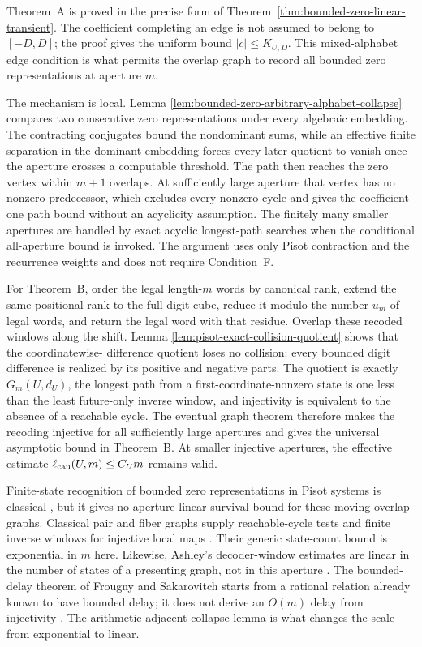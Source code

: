 Theorem~A is proved in the precise form of
Theorem~\ref{thm:bounded-zero-linear-transient}.  The coefficient completing
an edge is not assumed to belong to $[-D,D]$; the proof gives the uniform
bound $|c|\le K_{U,D}$.  This mixed-alphabet edge condition is what permits
the overlap graph to record all bounded zero representations at aperture
$m$.

The mechanism is local.  Lemma
\ref{lem:bounded-zero-arbitrary-alphabet-collapse} compares two consecutive
zero representations under every algebraic embedding.  The contracting
conjugates bound the nondominant sums, while an effective finite separation
in the dominant embedding forces every later quotient to vanish once the
aperture crosses a computable threshold.  The path then reaches the zero
vertex within $m+1$ overlaps.  At sufficiently large aperture that vertex
has no nonzero predecessor, which excludes every nonzero cycle and gives
the coefficient-one path bound without an acyclicity assumption.  The
finitely many smaller apertures are handled by exact acyclic longest-path
searches when the conditional all-aperture bound is invoked.  The argument
uses only Pisot contraction and the recurrence weights and does not require
Condition~F.

For Theorem~B, order the legal length-$m$ words by canonical rank, extend the
same positional rank to the full digit cube, reduce it modulo the number
$u_m$ of legal words, and return the legal word with that residue.  Overlap
these recoded windows along the shift.  Lemma
\ref{lem:pisot-exact-collision-quotient} shows that the coordinatewise-
difference quotient loses no collision: every bounded digit difference is
realized by its positive and negative parts.  The quotient is exactly
$G_m(U,d_U)$, the longest path from a first-coordinate-nonzero state is one
less than the least future-only inverse window, and injectivity is equivalent
to the absence of a reachable cycle.  The eventual graph theorem therefore
makes the recoding injective for all sufficiently large apertures and gives
the universal asymptotic bound in Theorem~B.  At smaller injective apertures,
the effective estimate $\ell_{\rm cau}(U,m)\le C_Um$ remains valid.

Finite-state recognition of bounded zero representations in Pisot systems is
classical \cite{Frougny1992}, but it gives no aperture-linear survival bound
for these moving overlap graphs.  Classical pair and fiber graphs supply
reachable-cycle tests and finite inverse windows for injective local maps
\cite{AmorosoPatt1972,Richardson1972,Nasu1977,Head1989,LindMarcus1995,
Nasu1995}.  Their generic state-count bound is exponential in $m$ here.
Likewise, Ashley's decoder-window estimates are linear in the number of
states of a presenting graph, not in this aperture
\cite{Ashley1988,Ashley1996}.  The bounded-delay theorem of Frougny and
Sakarovitch starts from a rational relation already known to have bounded
delay; it does not derive an $O(m)$ delay from injectivity
\cite{FrougnySakarovitch1991}.  The arithmetic adjacent-collapse lemma is
what changes the scale from exponential to linear.

